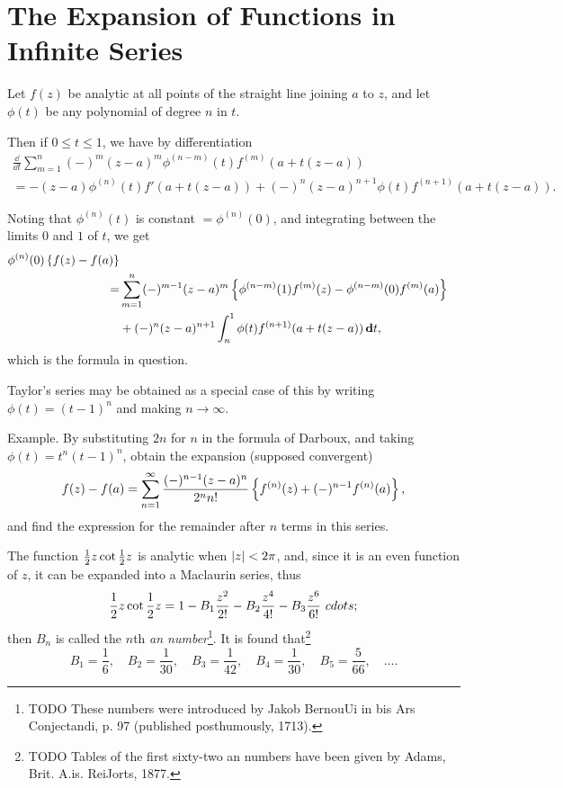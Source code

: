 %
%
\chapter{The Expansion of Functions in Infinite Series}


Let $f(z)$ be analytic at all points of the straight line joining $a$
to $z$, and let $\phi(t)$ be any polynomial of degree $n$ in $t$.

Then if $0 \leq t \leq 1$, we have by differentiation
\begin{align*}
  \frac{\dd }{\dd t}
  \sum_{m=1}^{n} (-)^{m} (z-a)^{m} \phi^{(n-m)}(t) f^{(m)}(a + t(z-a))
  \\
  =
  -(z-a) \phi^{(n)}(t) f'(a + t(z-a))
  +
  (-)^{n} (z-a)^{n+1} \phi(t) f^{(n+1)}(a + t (z-a)).
\end{align*}

Noting that $\phi^{(n)}(t)$ is constant $= \phi^{(n)}(0)$, and integrating
between the limits $0$ and $1$ of $t$, we get
\begin{align*}
  \phi^{(n)}(0) \left\{  f(z) - f(a)  \right\}
  \\
  =&
  \sum_{m=1}^{n} (-)^{m-1} (z-a)^{m}
  \left\{ 
    \phi^{(n-m)}(1) f^{(m)}(z) - \phi^{(n-m)}(0) f^{(m)}(a)
   \right\}
  \\
  &
  + (-)^{n} (z-a)^{n+1}
  \int_{n}^{1} \phi(t) f^{(n+1)}(a + t(z-a)) \, \mathbf{d} t,
\end{align*}
which is the formula in question.

Taylor's series may be obtained as a special case of this by writing
$\phi(t) = (t-1)^{n}$ and making $n\rightarrow\infty$.

Example. By substituting $2n$ for $n$ in the formula of Darboux, and
taking $\phi(t) = t^{n} (t-1)^{n}$, obtain the expansion (supposed convergent)
$$
f(z) - f(a)
=
\sum_{n=1}^{\infty}
\frac{ (-)^{n-1} (z-a)^{n} }{2^{n} n!}
\left\{  f^{(n)}(z) + (-)^{n-1} f^{(n)}(a)  \right\},
$$
and find the expression for the remainder after $n$ terms in this
series.

The function $\frac{1}{2} z \cot \frac{1}{2} z$ is analytic when $\left| z \right| <
2\pi$,
and, since it is an even function of $z$, it can be expanded into a
Maclaurin series, thus
$$
\frac{1}{2} z \cot \frac{1}{2} z
=
1
- B_{1} \frac{z^{2}}{2!}
- B_{2} \frac{z^{4}}{4!}
- B_{3} \frac{z^{6}}{6!}
\ cdots
;
$$
then $B_{n}$ is called the $n$th \emph{\Bernoulli an
  number}\footnote{TODO These numbers were introduced by Jakob BernouUi in bis Ars
Conjectandi, p. 97 (published posthumously, 1713).}.
It is found that\footnote{TODO Tables of the first sixty-two \Bernoulli an numbers have been given by
Adams, Brit. A.is. ReiJorts, 1877.}
$$
B_{1} = \frac{1}{6},
\quad
B_{2} = \frac{1}{30},
\quad
B_{3} = \frac{1}{42},
\quad
B_{4} = \frac{1}{30},
\quad
B_{5} = \frac{5}{66},
\quad
\ldots.
$$

